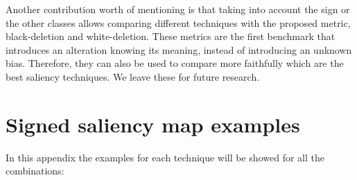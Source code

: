 \documentclass[preprint,12pt]{elsarticle}
\begin{document}
Another contribution worth of mentioning is that taking into account the sign or the other classes allows comparing different techniques with the proposed metric, black-deletion and white-deletion. These metrics are the first benchmark that introduces an alteration knowing its meaning, instead of introducing an unknown bias. Therefore, they can also be used to compare more faithfully which are the best saliency techniques. We leave these for future research.


 
{\small}

\appendix

\section{Signed saliency map examples}
\label{sec:signed saliency map examples}
In this appendix the examples for each technique will be showed for all the combinations:
\end{document}
